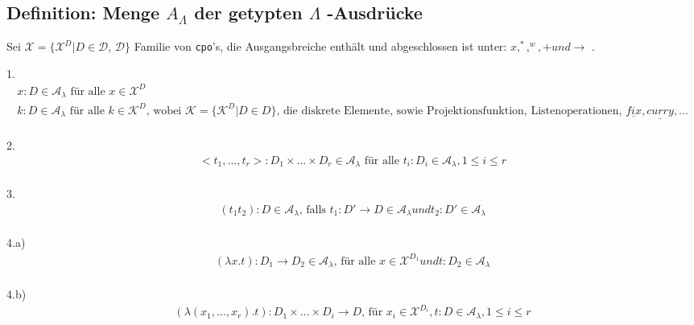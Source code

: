 \subsection{Definition: Menge $A_{\Lambda}$ der getypten $\Lambda$ -Ausdrücke}
Sei $\mathcal{X} = \{ \mathcal{X}^D | D \in \mathcal{D}$, $\mathcal{D} \}$ Familie von \lstinline!cpo!'s, die Ausgangsbreiche enthält und abgeschlossen ist unter: $x, ^* , ^w , + und \rightarrow$ .\\
\begin{compactitem}
\item[1.] \begin{align*}
x : D \in \mathcal{A}_\lambda \text{ für alle } x \in \mathcal{X}^D \tag{Atome, Variable}\\
k : D \in \mathcal{A}_\lambda \text{ für alle } k \in \mathcal{K}^D \text{, wobei } \mathcal{K} = \{ \mathcal{K}^D | D \in D \} \text{, die diskrete Elemente, sowie Projektionsfunktion, Listenoperationen, } \underline{fix}, \underline{curry}, \dots \\
\end{align*}
\item[2.] \begin{align*}
<t_1, \dots , t_r> : D_1 \times \dots \times D_r \in \mathcal{A}_\lambda \text{ für alle } t_i : D_i \in \mathcal{A}_\lambda, 1 \leq i \leq r \tag{Tupel}\\
\end{align*}
\item[3.] \begin{align*}
(t_1 t_2) : D \in \mathcal{A}_\lambda \text{, falls } t_1 : D' \rightarrow D \in \mathcal{A}_\lambda und t_2 : D' \in \mathcal{A}_\lambda \tag{Applilation} \\
\end{align*}
\item[4.a)] \begin{align*}
(\lambda x.t) : D_1 \rightarrow D_2 \in \mathcal{A}_\lambda \text{, für alle } x \in \mathcal{X}^{D_1} und t:D_2 \in \mathcal{A}_\lambda  \tag{monadisch}\\
\end{align*}
\item[4.b)] \begin{align*}
(\lambda (x_1, \dots , x_r).t) : D_1 \times \dots \times D_i \rightarrow D \text{, für } x_i \in \mathcal{X}^{D_i}, t:D \in \mathcal{A}_\lambda, 1 \leq  i \leq r\tag{polyadisch}\\
\end{align*}
\end{compactitem}
